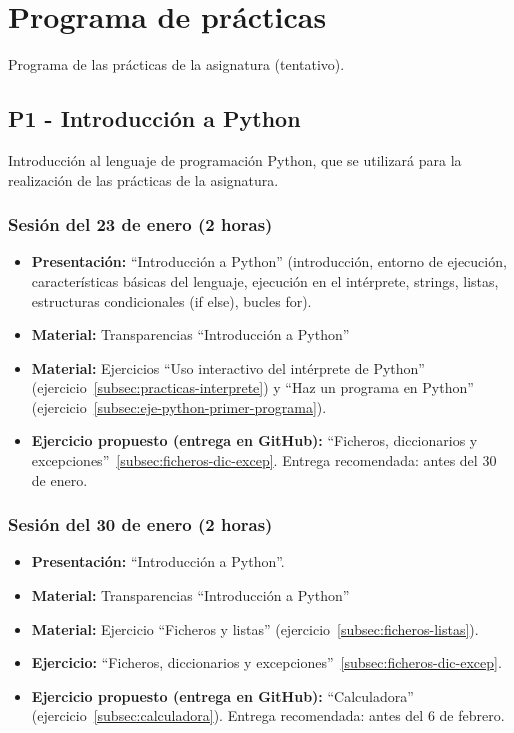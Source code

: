 \documentclass[a4paper,12pt]{article}
\begin{document}
\section{Programa de prácticas}

Programa de las prácticas de la asignatura (tentativo).

\subsection{P1 - Introducción a Python}

Introducción al lenguaje de programación Python, que se utilizará para la realización de las prácticas de la asignatura.

\subsubsection{Sesión del 23 de enero (2 horas)}

\begin{itemize}
\item \textbf{Presentación:} ``Introducción a Python'' (introducción, entorno de ejecución, características básicas del lenguaje, ejecución en el intérprete, strings, listas, estructuras condicionales (if else), bucles for).
\item \textbf{Material:} Transparencias ``Introducción a Python''
\item \textbf{Material:} Ejercicios ``Uso interactivo del intérprete de Python'' (ejercicio~\ref{subsec:practicas-interprete}) y ``Haz un programa en Python'' (ejercicio~\ref{subsec:eje-python-primer-programa}).
\item \textbf{Ejercicio propuesto (entrega en GitHub):} ``Ficheros, diccionarios y excepciones''~\ref{subsec:ficheros-dic-excep}.
   Entrega recomendada: antes del 30 de enero.
\end{itemize}

\subsubsection{Sesión del 30 de enero (2 horas)}

\begin{itemize}
\item \textbf{Presentación:} ``Introducción a Python''.
\item \textbf{Material:} Transparencias ``Introducción a Python''
\item \textbf{Material:} Ejercicio ``Ficheros y listas'' (ejercicio~\ref{subsec:ficheros-listas}).
\item \textbf{Ejercicio:} ``Ficheros, diccionarios y excepciones''~\ref{subsec:ficheros-dic-excep}.
\item \textbf{Ejercicio propuesto (entrega en GitHub):} ``Calculadora'' (ejercicio~\ref{subsec:calculadora}).
   Entrega recomendada: antes del 6 de febrero.
\end{itemize}
\end{document}
